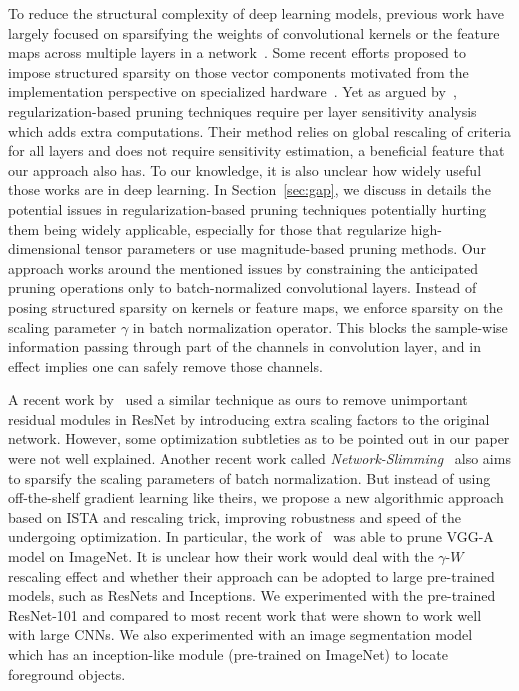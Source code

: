 \documentclass{article} %
\begin{document}
To reduce the structural complexity of deep learning models, 
previous work have largely focused on sparsifying the weights of convolutional kernels or the feature maps across multiple layers in a network~\citep{anwar2017structured,han2015learning}. Some recent efforts proposed
to impose structured sparsity on those vector components motivated from the implementation perspective on specialized hardware~\citep{wen2016learning,zhou2016less,alvarez2016learning,lebedev2016fast}. Yet as argued by~\citet{molchanov2016pruning}, regularization-based pruning techniques require per layer sensitivity analysis which adds extra computations.
Their method relies on global rescaling of criteria for all
layers and does not require sensitivity estimation, a beneficial feature that our approach
also has. To our knowledge, it is also unclear how widely useful those works are in deep learning.
In Section~\ref{sec:gap}, we discuss in details
the potential issues in regularization-based pruning techniques potentially hurting them being widely applicable, especially
for those that regularize high-dimensional tensor parameters or use magnitude-based pruning methods. 
Our approach works around the mentioned issues by constraining the anticipated pruning operations only
to batch-normalized convolutional layers. Instead of posing structured sparsity on
kernels or feature maps, we enforce sparsity on the scaling parameter $\gamma$ 
in batch normalization operator. This blocks the sample-wise information passing 
through part of the channels in convolution layer, and in effect implies one can safely remove those channels. 

A recent work by~\citet{huang2017data} used a similar technique as ours to remove unimportant residual modules in ResNet by 
introducing extra scaling factors to the original network. However, some optimization subtleties as to be pointed
out in our paper were not well explained. 
Another recent work called \textit{Network-Slimming}~\citep{liu2017learning} 
also aims to sparsify the scaling parameters of batch normalization. But instead
of using off-the-shelf gradient learning like theirs, we propose a new algorithmic approach based on
ISTA and rescaling trick, improving  robustness and speed of the undergoing optimization. In particular,
the work of~\citet{liu2017learning} was able to prune VGG-A model on ImageNet. 
It is unclear how their work would deal with the $\gamma$-$W$ rescaling effect
and whether their approach can be adopted to large pre-trained models, such as ResNets and Inceptions. 
We experimented with the pre-trained ResNet-101 and compared to most recent work that were shown to work well with large CNNs. 
We also experimented with an image segmentation model which has an inception-like module (pre-trained on ImageNet) to locate foreground objects. 
\end{document}
